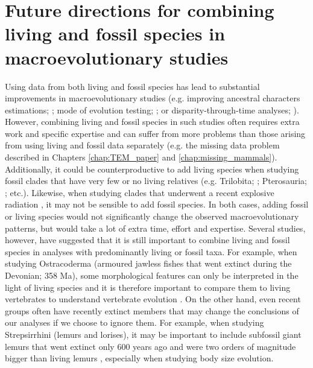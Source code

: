 \section{Future directions for combining living and fossil species in macroevolutionary studies}
Using data from both living and fossil species has lead to substantial improvements in macroevolutionary studies (e.g. improving ancestral characters estimations; \citealt{Finarelli2006}; mode of evolution testing; \citealt{Slater2012MEE,pant2014complex}; or disparity-through-time analyses; \citealt{Mitchell2015}).
However, combining living and fossil species in such studies often requires extra work and specific expertise \citep[e.g. the study by][gathered experts in statistics, bioinformatics, phylogenetics and palaeontology]{ronquista2012} and can suffer from more problems than those arising from using living and fossil data separately (e.g. the missing data problem described in Chapters \ref{chap:TEM_paper} and \ref{chap:missing_mammals}).
Additionally, it could be counterproductive to add living species when studying fossil clades that have very few or no living relatives (e.g. Trilobita; \citealt{hopkinsdecoupling2013}; Pterosauria; \citealt{Butler2012}; etc.).
Likewise, when studying clades that underwent a recent explosive radiation \citep[e.g. Cichlidae;][]{Genner01052007}, it may not be sensible to add fossil species.
In both cases, adding fossil or living species would not significantly change the observed macroevolutionary patterns, but would take a lot of extra time, effort and expertise.
Several studies, however, have suggested that it is still important to combine living and fossil species in analyses with predominantly living or fossil taxa.
For example, when studying Ostracoderma (armoured jawless fishes that went extinct during the Devonian; 358 Ma), some morphological features can only be interpreted in the light of living species and it is therefore important to compare them to living vertebrates to understand vertebrate evolution \citep{Janvier2015}.
On the other hand, even recent groups often have recently extinct members that may change the conclusions of our analyses if we choose to ignore them.
For example, when studying Strepsirrhini (lemurs and lorises), it may be important to include subfossil giant lemurs that went extinct only 600 years ago and were two orders of magnitude bigger than living lemurs \citep{goodman2003introduction}, especially when studying body size evolution.

